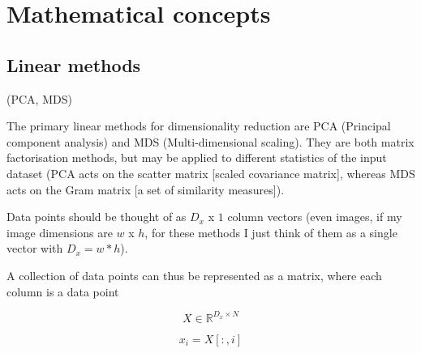 \documentclass[11pt]{article}
\begin{document}
\section{Mathematical concepts}

\subsection{Linear methods}
(PCA, MDS)

The primary linear methods for dimensionality reduction are PCA (Principal component analysis) and MDS (Multi-dimensional scaling). They are both matrix factorisation methods, but may be applied to different statistics of the input dataset (PCA acts on the scatter matrix [scaled covariance matrix], whereas MDS acts on the Gram matrix [a set of similarity measures]). 

Data points should be thought of as $D_x$ x $1$ column vectors (even images, if my image dimensions are $w$ x $h$, for these methods I just think of them as a single vector with $D_x = w*h$).

A collection of data points can thus be represented as a matrix, where each column is a data point

$$ X \in \mathbb{R}^{D_x\times N} $$

$$ x_i = X[:,i] $$
\end{document}
